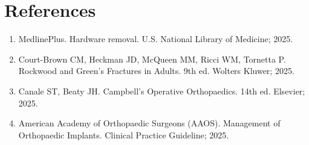 \section*{References}
\begin{enumerate}
  \item MedlinePlus. Hardware removal. U.S. National Library of Medicine; 2025.
  \item Court-Brown CM, Heckman JD, McQueen MM, Ricci WM, Tornetta P. Rockwood and Green's Fractures in Adults. 9th ed. Wolters Kluwer; 2025.
  \item Canale ST, Beaty JH. Campbell's Operative Orthopaedics. 14th ed. Elsevier; 2025.
  \item American Academy of Orthopaedic Surgeons (AAOS). Management of Orthopaedic Implants. Clinical Practice Guideline; 2025.
\end{enumerate}

\clearpage
